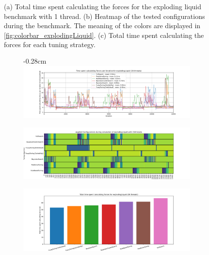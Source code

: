 \begin{figure}[H]
    \caption[Exploding liquid benchmark with 1 thread]{(a) Total time spent calculating the forces for the exploding liquid benchmark with 1 thread. (b) Heatmap of the tested configurations during the benchmark. The meaning of the colors are displayed in \ref{fig:colorbar_explodingLiquid}. (c) Total time spent calculating the forces for each tuning strategy.
    }

\end{figure}


\begin{figure}[H]
    \centering
    \begin{subfigure}[b]{0.94\textwidth}
        \addtolength{\leftskip} {-0.28cm} %
        \includegraphics[width=\columnwidth,trim={1cm 0 2cm 0.5cm},clip]{figures/Benchmark/timing_explodingLiquid_28.png}
        \caption{}
        \label{fig:explodingLiquid1Benchmark_28thread}
    \end{subfigure}

    \begin{subfigure}[b]{\textwidth}
        \includegraphics[width=\columnwidth,trim={0.5cm 0 0cm 0.5},clip]{figures/Benchmark/heatmap_explodingLiquid_28.png}
        \caption{}
        \label{fig:explodingLiquid1Heatmap_28thread}
    \end{subfigure}

    \begin{subfigure}[c]{\textwidth}
        \includegraphics[width=\columnwidth,trim={0.5cm 0 0cm 0.5},clip]{figures/Benchmark/total_time_explodingLiquid_28.png}
        \caption{}
        \label{fig:explodingLiquid1TotalTime_28thread}
    \end{subfigure}



\end{figure}
